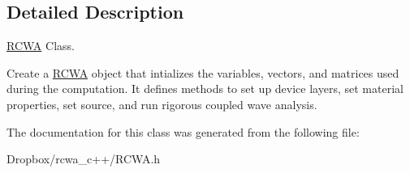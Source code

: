 \subsection{Detailed Description}
\hyperlink{class_r_c_w_a}{R\+C\+WA} Class. 

Create a \hyperlink{class_r_c_w_a}{R\+C\+WA} object that intializes the variables, vectors, and matrices used during the computation. It defines methods to set up device layers, set material properties, set source, and run rigorous coupled wave analysis. 

The documentation for this class was generated from the following file\+:\begin{DoxyCompactItemize}
\item 
Dropbox/rcwa\+\_\+c++/R\+C\+W\+A.\+h\end{DoxyCompactItemize}
